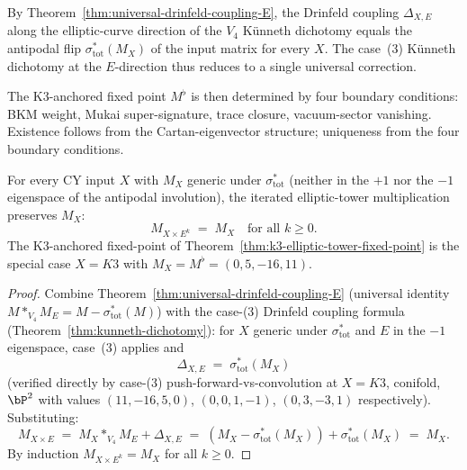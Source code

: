 \begin{remark}[\texorpdfstring{$\Delta_{X,E} = \sigma_{\mathrm{tot}}^*(M_X)$}{Delta-X,E = sigma-tot-*(M-X)}]
\label{rem:E-direction-antipodal-collapse}
By Theorem~\ref{thm:universal-drinfeld-coupling-E}, the Drinfeld coupling
$\Delta_{X, E}$ along the elliptic-curve direction of the $V_4$ Künneth
dichotomy equals the antipodal flip $\sigma_{\mathrm{tot}}^*(M_X)$ of the
input matrix for every $X$. The case~(3) Künneth dichotomy at the
$E$-direction thus reduces to a single universal correction.

The K$3$-anchored fixed point $M^\flat$ is then determined by four boundary
conditions: BKM weight, Mukai super-signature, trace closure, vacuum-sector
vanishing. Existence follows from the Cartan-eigenvector structure;
uniqueness from the four boundary conditions.
\end{remark}


\begin{theorem}
\label{thm:universal-elliptic-tower-fixed-point}
For every CY input $X$ with $M_X$ generic under $\sigma_{\mathrm{tot}}^*$
\textup{(}neither in the $+1$ nor the $-1$ eigenspace of the antipodal
involution\textup{)}, the iterated elliptic-tower multiplication preserves
$M_X$:
\[
 \boxed{\;M_{X \times E^k} \;=\; M_X \quad \text{for all } k \geq 0.\;}
\]
The K$3$-anchored fixed-point of Theorem~\ref{thm:k3-elliptic-tower-fixed-point}
is the special case $X = K3$ with $M_X = M^\flat = (0, 5, -16, 11)$.
\end{theorem}

\begin{proof}
Combine Theorem~\ref{thm:universal-drinfeld-coupling-E} \textup{(}universal
identity $M *_{V_4} M_E = M - \sigma_{\mathrm{tot}}^*(M)$\textup{)} with
the case-(3) Drinfeld coupling formula
\textup{(}Theorem~\ref{thm:kunneth-dichotomy}\textup{):} for $X$ generic
under $\sigma_{\mathrm{tot}}^*$ and $E$ in the $-1$ eigenspace, case~(3)
applies and
\[
 \Delta_{X, E} \;=\; \sigma_{\mathrm{tot}}^*(M_X)
\]
\textup{(}verified directly by case-(3) push-forward-vs-convolution at
$X = K3$, conifold, $\bP^2$ with values $(11, -16, 5, 0)$, $(0, 0, 1, -1)$,
$(0, 3, -3, 1)$ respectively\textup{).} Substituting:
\[
 M_{X \times E} \;=\; M_X *_{V_4} M_E + \Delta_{X, E}
 \;=\; (M_X - \sigma_{\mathrm{tot}}^*(M_X)) + \sigma_{\mathrm{tot}}^*(M_X)
 \;=\; M_X.
\]
By induction $M_{X \times E^k} = M_X$ for all $k \geq 0$.
\end{proof}

